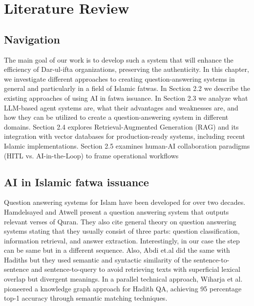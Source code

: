 \chapter{Literature Review}
\label{chap:lr}

\section{Navigation}

The main goal of our work is to develop such a system that will enhance the efficiency of Dar-ul-ifta 
organizations, preserving the authenticity. In this chapter, we investigate different approaches to creating question-answering systems in general and particularly in a field of Islamic fatwas. In Section 2.2 we describe the existing approaches of using AI in fatwa issuance. In Section 2.3 we analyze what LLM-based agent systems are, what their advantages and weaknesses are, and how they can be utilized to create a question-answering system in different domains. Section 2.4 explores Retrieval-Augmented Generation (RAG) and its integration with vector databases for production-ready systems, including recent Islamic implementations. Section 2.5 examines human-AI collaboration paradigms (HITL vs. AI-in-the-Loop) to frame operational workflows

\section{AI in Islamic fatwa issuance}

Question answering systems for Islam have been developed for over two decades.
Hamdelsayed and Atwell \cite{hamdelsayed2016islamic} present a question answering system that outputs relevant verses of Quran. They also cite general theory on question answering systems stating that they usually consist of three parts: question classification, information retrieval, and answer extraction. Interestingly, in our case the step can be same but in a different sequence.
Also, Abdi et.al \cite{abdi2020question} did the same with Hadiths but they used semantic and syntactic similarity of the sentence-to-sentence and sentence-to-query to avoid retrieving texts with superficial lexical overlap but divergent meanings. In a parallel technical approach, Wiharja et al. \cite{wiharja2022questions} pioneered a knowledge graph approach for Hadith QA, achieving 95 percentage top-1 accuracy through semantic matching techniques.

